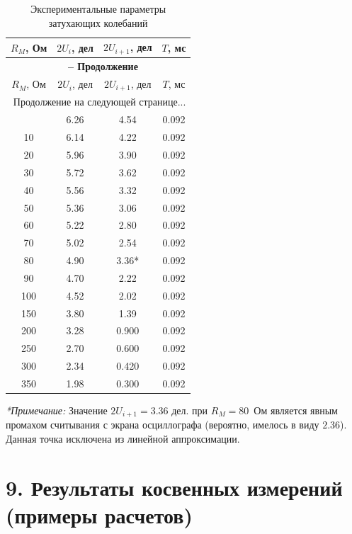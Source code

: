 \documentclass[a4paper,12pt]{article}
\begin{document}
\begin{longtable}{|c|c|c|c|}
    \caption{Экспериментальные параметры затухающих колебаний} \label{tab:damping_raw_data} \\
    \hline
    $R_M$, Ом & $2U_i$, дел & $2U_{i+1}$, дел & $T$, мс \\ \hline
    \endfirsthead
    \multicolumn{4}{c}{{\bfseries \tablename\ \thetable{} -- Продолжение}} \\ \hline
    $R_M$, Ом & $2U_i$, дел & $2U_{i+1}$, дел & $T$, мс \\ \hline
    \endhead
    \hline \multicolumn{4}{|r|}{{Продолжение на следующей странице...}} \\ \hline
    \endfoot
    \hline
    \endlastfoot
    0   & 6.26 & 4.54  & 0.092 \\ \hline
    10  & 6.14 & 4.22  & 0.092 \\ \hline
    20  & 5.96 & 3.90  & 0.092 \\ \hline
    30  & 5.72 & 3.62  & 0.092 \\ \hline
    40  & 5.56 & 3.32  & 0.092 \\ \hline
    50  & 5.36 & 3.06  & 0.092 \\ \hline
    60  & 5.22 & 2.80  & 0.092 \\ \hline
    70  & 5.02 & 2.54  & 0.092 \\ \hline
    80  & 4.90 & 3.36* & 0.092 \\ \hline
    90  & 4.70 & 2.22  & 0.092 \\ \hline
    100 & 4.52 & 2.02  & 0.092 \\ \hline
    150 & 3.80 & 1.39  & 0.092 \\ \hline
    200 & 3.28 & 0.900 & 0.092 \\ \hline
    250 & 2.70 & 0.600 & 0.092 \\ \hline
    300 & 2.34 & 0.420 & 0.092 \\ \hline
    350 & 1.98 & 0.300 & 0.092 \\ \hline
\end{longtable}
\textit{*Примечание:} Значение $2U_{i+1} = 3.36$ дел. при $R_M = 80$~Ом является явным промахом считывания с экрана осциллографа (вероятно, имелось в виду $2.36$). Данная точка исключена из линейной аппроксимации.

\section*{\hspace{30pt}9. Результаты косвенных измерений (примеры расчетов)}
\end{document}
